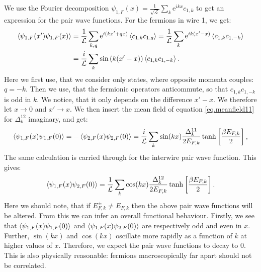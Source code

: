 We use the Fourier decomposition $\psi_{1,F}(x) = \frac{1}{\sqrt{\mathcal{L}}} \sum_k \text{e}^{ikx} c_{1,k}$ to get an expression for the pair wave functions. For the fermions in wire 1, we get:
\begin{align}
\braket{\psi_{1,F}(x')\psi_{1,F}(x)} 
&= \frac{1}{\mathcal{L}} \sum_{k,q} \text{e}^{i(kx' + qx)}\braket{c_{1,k}c_{1,q}} = \frac{1}{\mathcal{L}} \sum_{k} \text{e}^{ik(x' - x)}\braket{c_{1,k}c_{1,-k}} \nonumber \\
&= \frac{i}{\mathcal{L}} \sum_{k} \sin\left(k(x' - x)\right)\braket{c_{1,k}c_{1,-k}}. \nonumber 
\end{align}
Here we first use, that we consider only states, where opposite momenta couples: $q = -k$. Then we use, that the fermionic operators anticommute, so that $c_{1,k}c_{1,-k}$ is odd in $k$. We notice, that it only depends on the difference $x' - x$. We therefore let $x \to 0$ and $x' \to x$. We then insert the mean field of equation \eqref{eq.meanfield11} for $\Delta^{12}_k$ imaginary, and get:
\begin{equation}
\braket{\psi_{1,F}(x)\psi_{1,F}(0)} = - \braket{\psi_{2,F}(x)\psi_{2,F}(0)} = \frac{i}{\mathcal{L}}\sum_k \sin(kx) \frac{\Delta^{11}_k}{2E_{F,k}}\tanh\left[\frac{ \beta E_{F,k} }{2}\right], 
\label{eq.intrawirepairwavefunction}
\end{equation}
The same calculation is carried through for the interwire pair wave function. This gives:
\begin{equation}
\braket{\psi_{1,F}(x)\psi_{2,F}(0)} = \frac{1}{\mathcal{L}}\sum_k \cos(kx) \frac{\Delta^{12}_k}{2E_{F,k}}\tanh\left[\frac{ \beta E_{F,k} }{2}\right].
\label{eq.interwirepairwavefunction}
\end{equation} 
Here we should note, that if $E^\pm_{F,k} \neq E_{F,k}$ then the above pair wave functions will be altered. From this we can infer an overall functional behaviour. Firstly, we see that $\braket{\psi_{1,F}(x)\psi_{1,F}(0)}$ and $\braket{\psi_{1,F}(x)\psi_{2,F}(0)}$ are respectively odd and even in $x$. Further, $\sin(kx)$ and $\cos(kx)$ oscillate more rapidly as a function of $k$ at higher values of $x$. Therefore, we expect the pair wave functions to decay to 0. This is also physically reasonable: fermions macroscopically far apart should not be correlated. 

